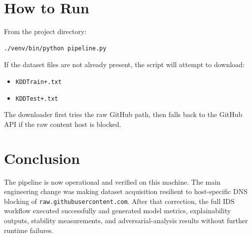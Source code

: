 \documentclass[11pt]{article}
\begin{document}
\section{How to Run}
From the project directory:

\begin{verbatim}
./venv/bin/python pipeline.py
\end{verbatim}

If the dataset files are not already present, the script will attempt to download:
\begin{itemize}[leftmargin=*]
    \item \texttt{KDDTrain+.txt}
    \item \texttt{KDDTest+.txt}
\end{itemize}

The downloader first tries the raw GitHub path, then falls back to the GitHub API if the raw content host is blocked.

\section{Conclusion}
The pipeline is now operational and verified on this machine. The main engineering change was making dataset acquisition resilient to host-specific DNS blocking of \texttt{raw.githubusercontent.com}. After that correction, the full IDS workflow executed successfully and generated model metrics, explainability outputs, stability measurements, and adversarial-analysis results without further runtime failures.
\end{document}
